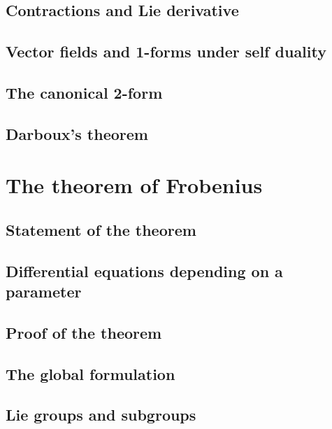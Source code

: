 \documentclass[a4paper]{article}
\begin{document}
\subsection{Contractions and Lie derivative}

\subsection{Vector fields and 1-forms under self duality}

\subsection{The canonical 2-form}

\subsection{Darboux's theorem}

\section{The theorem of Frobenius}

\subsection{Statement of the theorem}

\subsection{Differential equations depending on a parameter}

\subsection{Proof of the theorem}

\subsection{The global formulation}

\subsection{Lie groups and subgroups}
\end{document}
